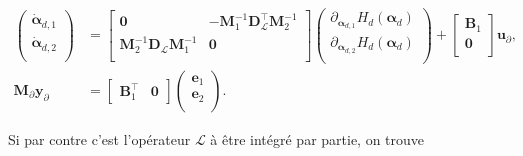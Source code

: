 \begin{equation*}
\begin{aligned}
\begin{pmatrix}
\dot{\bm{\alpha}}_{d, 1} \\
\dot{\bm{\alpha}}_{d, 2} \\
\end{pmatrix}
&= \begin{bmatrix}
\mathbf{0} & - \mathbf{M}_1^{-1} \mathbf{D}_{\mathcal{L}}^\top \mathbf{M}_2^{-1}\\
\mathbf{M}_2^{-1} \mathbf{D}_{\mathcal{L}} \mathbf{M}_1^{-1} & \mathbf{0} \\
\end{bmatrix} 
\begin{pmatrix}
\partial_{\bm{\alpha}_{d, 1}} H_d(\bm{\alpha}_d)\\
\partial_{\bm{\alpha}_{d, 2}} H_d(\bm{\alpha}_d)\\
\end{pmatrix} + 
\begin{bmatrix}
\mathbf{B}_1\\
\mathbf{0}\\
\end{bmatrix}
\mathbf{u}_\partial,  \\
\mathbf{M}_\partial {\mathbf{y}_\partial} &= \begin{bmatrix}
\mathbf{B}_1^\top & \mathbf{0}
\end{bmatrix}\begin{pmatrix}
\mathbf{e}_{1} \\
\mathbf{e}_{2} \\
\end{pmatrix}.
\end{aligned}
\end{equation*}

Si par contre c'est l'opérateur $\mathcal{L}$ à être intégré par partie, on trouve

